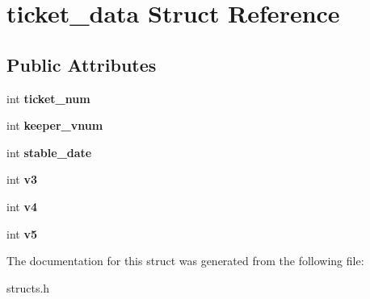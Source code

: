 \hypertarget{structticket__data}{\section{ticket\-\_\-data Struct Reference}
\label{structticket__data}
}
\subsection*{Public Attributes}
\begin{DoxyCompactItemize}
\item 
\hypertarget{structticket__data_a3f07c5664b95e0d5bc6f28315462b044}{int {\bfseries ticket\-\_\-num}}\label{structticket__data_a3f07c5664b95e0d5bc6f28315462b044}

\item 
\hypertarget{structticket__data_a6a41b7824dc8014d01492d101a87da55}{int {\bfseries keeper\-\_\-vnum}}\label{structticket__data_a6a41b7824dc8014d01492d101a87da55}

\item 
\hypertarget{structticket__data_ab249e3b12b7c214c269a411553be4591}{int {\bfseries stable\-\_\-date}}\label{structticket__data_ab249e3b12b7c214c269a411553be4591}

\item 
\hypertarget{structticket__data_a49e2dd23e6aaf1ffba0db9a4138f89a7}{int {\bfseries v3}}\label{structticket__data_a49e2dd23e6aaf1ffba0db9a4138f89a7}

\item 
\hypertarget{structticket__data_aec88d5f38898662e1b7d0035ab259c8a}{int {\bfseries v4}}\label{structticket__data_aec88d5f38898662e1b7d0035ab259c8a}

\item 
\hypertarget{structticket__data_a436bfddcf5066e7f186a9281ae7e818e}{int {\bfseries v5}}\label{structticket__data_a436bfddcf5066e7f186a9281ae7e818e}

\end{DoxyCompactItemize}


The documentation for this struct was generated from the following file\-:\begin{DoxyCompactItemize}
\item 
structs.\-h\end{DoxyCompactItemize}
